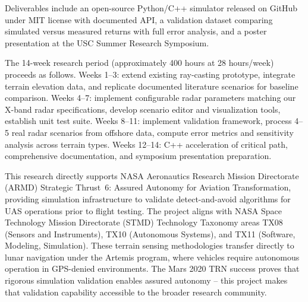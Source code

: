 \documentclass[12pt]{article}
\newcommand{\sect}[1]{\noindent{\color{garnet}\textbf{\textsc{#1}}.}}
\begin{document}
Deliverables include an open-source Python/C++ simulator released on GitHub under MIT license with documented API, a validation dataset comparing simulated versus measured returns with full error analysis, and a poster presentation at the USC Summer Research Symposium.

\sect{Timeline}
The 14-week research period (approximately 400 hours at 28 hours/week) proceeds as follows. Weeks 1--3: extend existing ray-casting prototype, integrate terrain elevation data, and replicate documented literature scenarios for baseline comparison. Weeks 4--7: implement configurable radar parameters matching our X-band radar specifications, develop scenario editor and visualization tools, establish unit test suite. Weeks 8--11: implement validation framework, process 4--5 real radar scenarios from offshore data, compute error metrics and sensitivity analysis across terrain types. Weeks 12--14: C++ acceleration of critical path, comprehensive documentation, and symposium presentation preparation.

\sect{NASA Relevance} This research directly supports NASA Aeronautics Research Mission Directorate (ARMD) Strategic Thrust~6: Assured Autonomy for Aviation Transformation, providing simulation infrastructure to validate detect-and-avoid algorithms for UAS operations prior to flight testing. The project aligns with NASA Space Technology Mission Directorate (STMD) Technology Taxonomy areas TX08 (Sensors and Instruments), TX10 (Autonomous Systems), and TX11 (Software, Modeling, Simulation). These terrain sensing methodologies transfer directly to lunar navigation under the Artemis program, where vehicles require autonomous operation in GPS-denied environments. The Mars 2020 TRN success proves that rigorous simulation validation enables assured autonomy -- this project makes that validation capability accessible to the broader research community.
\end{document}
